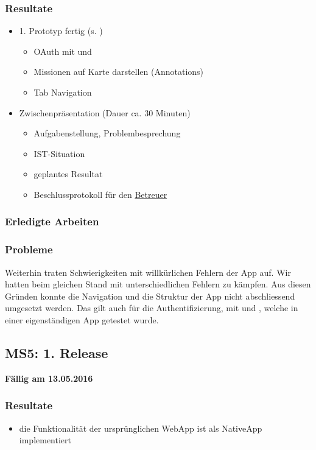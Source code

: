 \subsubsection{Resultate}
\begin{itemize}
	\item 1. Prototyp fertig (s. )
	\begin{itemize}
		\item OAuth mit  und 
		\item Missionen auf Karte darstellen (Annotations)
		\item Tab Navigation
	\end{itemize}
	\item Zwischenpräsentation (Dauer ca. 30 Minuten)
	\begin{itemize}
		\item Aufgabenstellung, Problembesprechung
		\item IST-Situation
		\item geplantes Resultat
		\item Beschlussprotokoll für den \hyperref[pm-rollen]{Betreuer}
	\end{itemize}
\end{itemize}

\subsubsection{Erledigte Arbeiten}


\subsubsection{Probleme}
Weiterhin traten Schwierigkeiten mit willkürlichen Fehlern der  App auf. 
Wir hatten beim gleichen Stand mit unterschiedlichen Fehlern zu kämpfen.
Aus diesen Gründen konnte die Navigation und die Struktur der App nicht abschliessend umgesetzt werden.
Das gilt auch für die Authentifizierung, mit  und , welche in einer eigenständigen App getestet wurde.

\subsection{MS5: 1. Release}
\label{pm-ms5}
\textbf{Fällig am 13.05.2016}
\subsubsection{Resultate}
\begin{itemize}
	\item die Funktionalität der ursprünglichen \kort{} \gls{WebApp} ist als \gls{NativeApp} implementiert
\end{itemize}

